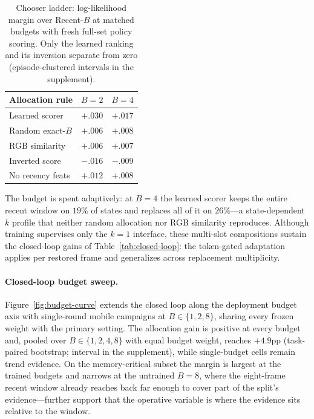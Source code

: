 \documentclass[letterpaper]{article} %
\begin{document}
\begin{table}[t]
\centering
{\small
\setlength{\tabcolsep}{4.0pt}
\begin{tabular}{@{}lcc@{}}
\toprule
Allocation rule & $B{=}2$ & $B{=}4$ \\
\midrule
Learned scorer & $+.030$ & $+.017$ \\
Random exact-$B$ & $+.006$ & $+.008$ \\
RGB similarity & $+.006$ & $+.007$ \\
Inverted score & $-.016$ & $-.009$ \\
No recency feats & $+.012$ & $+.008$ \\
\bottomrule
\end{tabular}
}
\caption{Chooser ladder: log-likelihood margin over Recent-$B$ at matched
budgets with fresh full-set policy scoring. Only the learned ranking and
its inversion separate from zero (episode-clustered intervals in the
supplement).}
\label{tab:chooser}
\end{table}

 The budget is spent adaptively: at $B{=}4$ the learned scorer keeps the
entire recent window on $19\%$ of states and replaces all of it on
$26\%$---a state-dependent $k$ profile that neither random allocation nor
RGB similarity reproduces. Although training supervises only the
$k{=}1$ interface, these multi-slot compositions sustain the closed-loop
gains of Table~\ref{tab:closed-loop}: the token-gated adaptation applies
per restored frame and generalizes across replacement multiplicity.

\paragraph{Closed-loop budget sweep.}
Figure~\ref{fig:budget-curve} extends the closed loop along the deployment budget
axis with single-round mobile campaigns at $B\in\{1,2,8\}$, sharing every
frozen weight with the primary setting. The allocation gain is positive at
every budget and, pooled over $B\in\{1,2,4,8\}$ with equal budget weight,
reaches $+4.9$pp (task-paired bootstrap; interval in the supplement), while
single-budget cells remain trend evidence. On the memory-critical subset
the margin is largest at the trained budgets and narrows at the untrained
$B{=}8$, where the eight-frame recent window already reaches back far
enough to cover part of the split's evidence---further support that the
operative variable is where the evidence sits relative to the window.
\end{document}
